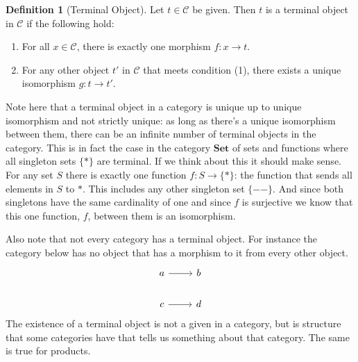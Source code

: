 \documentclass[12pt]{article}
\theoremstyle{definition}
\newtheorem{definition}{Definition}
\begin{document}
\begin{definition}[Terminal Object]
    Let $t\in\mathcal{C}$ be given. Then $t$ is a terminal object in $\mathcal{C}$ if the following hold:
    \begin{enumerate}
        \item For all $x\in\mathcal{C}$, there is exactly one morphism $f:x\rightarrow t$.
        \item For any other object $t'$ in $\mathcal{C}$ that meets condition (1), there exists a unique isomorphism $g:t\rightarrow t'$.
    \end{enumerate}
\end{definition}
Note here that a terminal object in a category is unique up to unique isomorphism and not strictly unique: as long as there's a unique isomorphism between them, there can be an infinite number of terminal objects in the category.
This is in fact the case in the category $\textbf{Set}$ of sets and functions where all singleton sets $\{*\}$ are terminal.
If we think about this it should make sense.
For any set $S$ there is exactly one function $f:S \rightarrow \{*\}$: the function that sends all elements in $S$ to $*$.
This includes any other singleton set $\{--\}$.
And since both singletons have the same cardinality of one and since $f$ is surjective we know that this one function, $f$, between them is an isomorphism.

Also note that not every category has a terminal object.
For instance the category below has no object that has a morphism to it from every other object.
\[\begin{tikzcd}
        a & b \\
        c & d
        \arrow[from=1-1, to=1-2]
        \arrow[from=2-1, to=2-2]
    \end{tikzcd}\]
The existence of a terminal object is not a given in a category, but is structure that some categories have that tells us something about that category.
The same is true for products.
\end{document}
